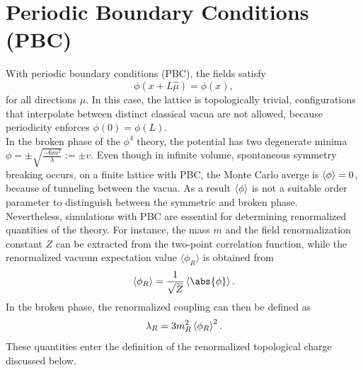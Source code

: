 \section{Periodic Boundary Conditions (PBC)}
With periodic boundary conditions (PBC), the fields satisfy 
\begin{equation}
    \phi(x + L\hat{\mu}) = \phi(x), 
\end{equation}
for all directions $\hat{\mu}$. In this case, the lattice is topologically trivial, configurations that 
interpolate between distinct classical vacua are not allowed, because periodicity enforces $\phi(0) = \phi(L)$. \\
In the broken phase of the $\phi^4$ theory, the potential has two degenerate minima $\phi = \pm \sqrt{\frac{-6m^2}{\lambda}} := \pm v$. 
Even though in infinite volume, spontaneous symmetry breaking occurs, on a finite lattice with PBC, the Monte Carlo averge is $\braket{\phi} = 0$, 
because of tunneling between the vacua. As a result $\braket{\phi}$ is not a suitable order parameter to distinguish
between the symmetric and broken phase. \\
Nevertheless, simulations with PBC are essential for determining renormalized quantities of the theory. For instance, the mass $m$ and the field
renormalization constant $Z$ can be extracted from the two-point correlation function, while the renormalized vacuum expectation value $\langle \phi_R \rangle$
is obtained from
\begin{equation}
    \braket{\phi_R} = \frac{1}{\sqrt{Z}}\braket{\abs{\phi}}.
\end{equation}
In the broken phase, the renormalized coupling can then be defined as 
\begin{equation}
    \lambda_R = 3 m_R^2 \braket{\phi_R}^2. \label{eq: lambda_R}
\end{equation}
These quantities enter the definition of the renormalized topological charge discussed below.
